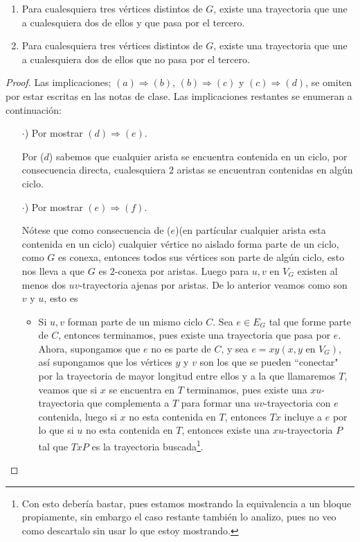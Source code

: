 \documentclass{article}
\begin{document}
\begin{enumerate}
\begin{enumerate}
  \item Para cualesquiera tres v\'ertices distintos de $G$, existe una
    trayectoria que une a cualesquiera dos de ellos y que pasa por el
    tercero.

  \item Para cualesquiera tres v\'ertices distintos de $G$, existe una
    trayectoria que une a cualesquiera dos de ellos que no pasa por el
    tercero.
  \end{enumerate}

  \renewcommand\qedsymbol{QED}
  \begin{proof}
    Las implicaciones; $(a) \Rightarrow (b)$, $(b) \Rightarrow (c)$
    y $(c) \Rightarrow (d)$, se omiten por estar escritas en las
    notas de clase. Las implicaciones restantes se enumeran a
    continuación:
    \begin{itemize}
    \item[$\cdot$)] Por mostrar $(d) \Rightarrow (e)$.

      Por ($d$) sabemos que cualquier arista se encuentra
      contenida en un ciclo, por consecuencia directa,
      cualesquiera $2$ aristas se encuentran contenidas en
      algún ciclo.

    \item[$\cdot$)] Por mostrar $(e) \Rightarrow (f)$.

      Nótese que como consecuencia de ($e$)(en partícular
      cualquier arista esta contenida en un ciclo)
      cualquier vértice no aislado forma parte de un ciclo,
      como $G$ es conexa, entonces todos sus vértices son
      parte de algún ciclo, esto nos lleva a que $G$ es
      $2$-conexa por aristas. Luego para $u,v$ en $V_G$
      existen al menos dos $uv$-trayectoria ajenas por
      aristas. De lo anterior veamos como son $v$ y $u$,
      esto es

      \begin{itemize}
      \item Si $u, v$ forman parte de un mismo ciclo $C$.
        Sea $e \in E_G$ tal que forme parte de $C$, entonces
        terminamos, pues existe una trayectoria que pasa por
        $e$. Ahora, supongamos que $e$ no es parte de $C$, y
        sea $e = xy (x, y \text{ en } V_G)$, así supongamos que
        los vértices $y$ y $v$ son los que se pueden ``conectar"
        por la trayectoria de mayor longitud entre ellos y a la
        que llamaremos $T$, veamos que si $x$ se encuentra en $T$
        terminamos, pues existe una $xu$-trayectoria que complementa
        a $T$ para formar una $uv$-trayectoria con $e$ contenida, luego
        si $x$ no esta contenida en $T$, entonces $Tx$ incluye a $e$ por
        lo que si $u$ no esta contenida en $T$, entonces existe una
        $xu$-trayectoria $P$ tal que $TxP$ es la trayectoria buscada\footnote{
          Con esto debería bastar, pues estamos mostrando la equivalencia
          a un bloque propiamente, sin embargo el caso restante también
          lo analizo, pues no veo como descartalo sin usar lo que estoy
          mostrando.}.


\end{itemize}
\end{itemize}
\end{proof}
\end{enumerate}
\end{document}
